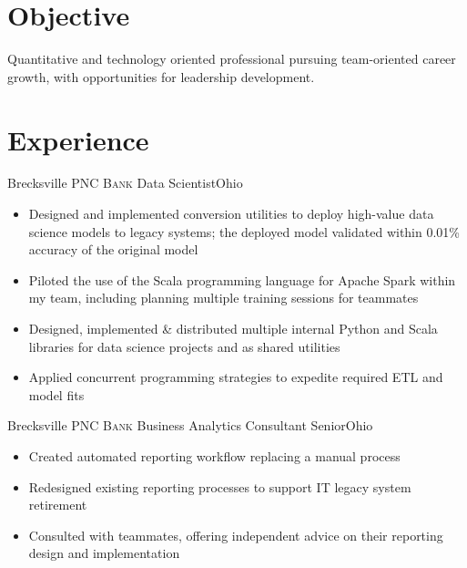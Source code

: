 \documentclass[letterpaper,12pt,color,final]{moderncv}
\begin{document}
\makecvtitle

\section{Objective}



Quantitative and technology oriented professional pursuing team-oriented career growth, with opportunities for leadership development.

\section{Experience}

{Brecksville}
{\textsc{PNC Bank}}
{Data Scientist}{Ohio}
{\begin{itemize}
  \item Designed and implemented conversion utilities to deploy high-value data science models to legacy systems; the deployed model validated within 0.01\% accuracy of the original model
  \item Piloted the use of the Scala programming language for Apache Spark within my team, including planning multiple training sessions for teammates
  \item Designed, implemented \& distributed multiple internal Python and Scala libraries for data science projects and as shared utilities
  \item Applied concurrent programming strategies to expedite required ETL and model fits
 \end{itemize}}

{Brecksville}
{\textsc{PNC Bank}}
{Business Analytics Consultant Senior}{Ohio}
{\begin{itemize}
  \item Created automated reporting workflow replacing a manual process
  \item Redesigned existing reporting processes to support IT legacy system retirement
  \item Consulted with teammates, offering independent advice on their reporting design and implementation
 \end{itemize}}
\end{document}
